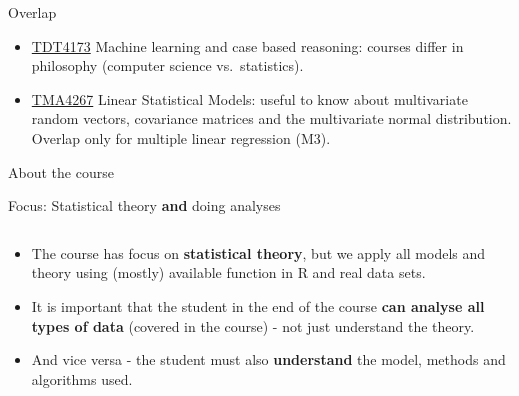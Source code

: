 \documentclass[10pt,ignorenonframetext,]{beamer}
\providecommand{\tightlist}{%
  \setlength{\itemsep}{0pt}\setlength{\parskip}{0pt}}
\begin{document}
\begin{frame}

\begin{block}{Overlap}

\vspace{2mm}

\begin{itemize}
\tightlist
\item
  \href{https://www.ntnu.no/studier/emner/TDT4173\#tab=omEmnet}{TDT4173}
  Machine learning and case based reasoning: courses differ in
  philosophy (computer science vs.~statistics).
\end{itemize}

\vspace{2mm}

\begin{itemize}
\tightlist
\item
  \href{https://www.ntnu.no/studier/emner/TMA4267\#tab=omEmnet}{TMA4267}
  Linear Statistical Models: useful to know about multivariate random
  vectors, covariance matrices and the multivariate normal distribution.
  Overlap only for multiple linear regression (M3).
\end{itemize}

\end{block}

\end{frame}

\begin{frame}{About the course}
\protect\hypertarget{about-the-course}{}

\begin{block}{Focus: Statistical theory \textbf{and} doing analyses}

\(~\)

\begin{itemize}
\tightlist
\item
  The course has focus on \textbf{statistical theory}, but we apply all
  models and theory using (mostly) available function in R and real data
  sets.
\end{itemize}

\vspace{2mm}

\begin{itemize}
\tightlist
\item
  It is important that the student in the end of the course \textbf{can
  analyse all types of data} (covered in the course) - not just
  understand the theory.
\end{itemize}

\vspace{2mm}

\begin{itemize}
\tightlist
\item
  And vice versa - the student must also \textbf{understand} the model,
  methods and algorithms used.
\end{itemize}

\end{block}

\end{frame}
\end{document}
